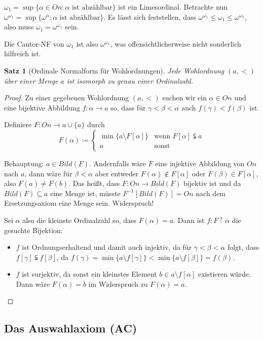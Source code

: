 \documentclass[german]{article}
\theoremstyle{break}
\theoremstyle{def_style}
\theoremstyle{def_style}
\newtheorem{satz}{Satz}[section]
\theoremstyle{lemma_style}
\begin{document}
$\omega_1=\sup\{\alpha\in On : \alpha \text{ ist abzählbar}\}$ ist ein Limesordinal. Betrachte nun $\omega^{\omega_1}=\sup\{\omega^\alpha : \alpha \text{ ist abzählbar}\}$. Es lässt sich feststellen, dass $\omega^{\omega_1}\leq\omega_1\leq\omega^{\omega_1}$, also muss $\omega_1=\omega^{\omega_1}$ sein.

Die Cantor-NF von $\omega_1$ ist also $\omega^{\omega_1}$, was offensichtlicherweise nicht sonderlich hilfreich ist.

\begin{satz}[Ordinale Normalform für Wohlordnungen]
	Jede Wohlordnung $(a,<)$ über einer Menge $a$ ist isomorph zu genau einer Ordinalzahl.
\end{satz}
\begin{proof}
	Zu einer gegebenen Wohlordnung $(a,<)$ suchen wir ein $\alpha\in On$ und eine bijektive Abbildung $f:\alpha\to a$ so, dass für $\gamma<\beta<\alpha$ auch $f(\gamma)<f(\beta)$ ist.
	
	Definiere $F:On\to a\cup\{a\}$ durch
	$$
	F(\alpha)\coloneqq\begin{cases}
		\min\{a\setminus F[\alpha]\} & \text{wenn } F[\alpha]\subsetneqq a\\
		a & \text{sonst}
	\end{cases}
	$$
	
	Behauptung: $a\in Bild(F)$. Andernfalls wäre $F$ eine injektive Abbildung von $On$ nach $a$, dann wäre für $\beta<\alpha$ aber entweder $F(\alpha)\notin F[\alpha]$ oder $F(\beta)\in F[\alpha]$, also $F(a)\neq F(b)$. Das heißt, dass $F:On\to Bild(F)$ bijektiv ist und da $Bild(F)\subseteq a$ eine Menge ist, müsste $F^{-1}[Bild(F)]=On$ nach dem Ersetzungsaxiom eine Menge sein. Widerspruch!
	
	Sei $\alpha$ also die kleinste Ordinalzahl so, dass $F(\alpha)=a$. Dann ist $f:F\upharpoonright \alpha$ die gesuchte Bijektion:
	\begin{itemize}
		\item $f$ ist Ordnungserhaltend und damit auch injektiv, da für $\gamma<\beta<\alpha$ folgt, dass $f[\gamma]\subsetneqq f[\beta]$, da $f(\gamma)=\min\{a\setminus f[\gamma]\}<\min\{a\setminus f[\beta]\}=f(\beta)$.
		\item $f$ ist surjektiv, da sonst ein kleinstes Element $b\in a\setminus f[\alpha]$ existieren würde. Dann wäre $F(\alpha)=b$ im Widerspruch zu $F(\alpha)=a$.
	\end{itemize}
\end{proof}

\subsection{Das Auswahlaxiom (AC)}
\end{document}
